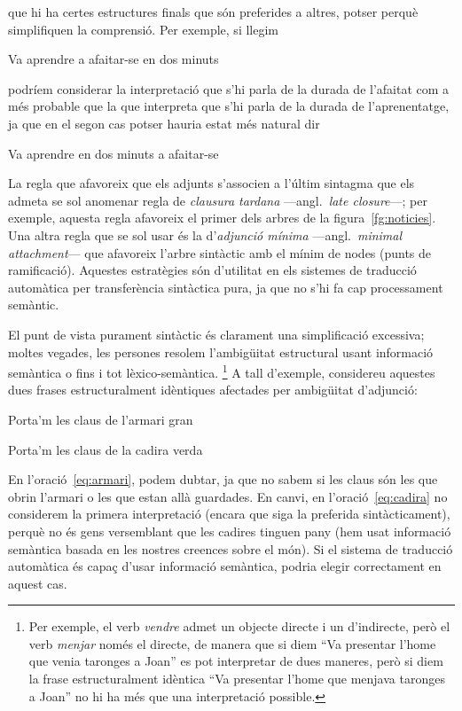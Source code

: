 que hi ha certes estructures finals que són preferides a altres,
potser perquè simplifiquen la comprensió.  Per exemple, si llegim
\begin{exemple}
Va aprendre a afaitar-se en dos minuts
\end{exemple} 
podríem considerar la interpretació que s'hi parla de la durada de
l'afaitat com a més probable que la que interpreta que s'hi parla de
la durada de l'aprenentatge, ja que en el segon cas potser hauria
estat més natural dir 
\begin{exemple}
Va aprendre en dos minuts a afaitar-se
\end{exemple}
La regla que afavoreix que els adjunts s'associen a l'últim sintagma
que els admeta se sol anomenar regla de \emph{clausura tardana}
---angl.\ \emph{late closure}---; per exemple, aquesta regla afavoreix
el primer dels arbres de la figura~\ref{fg:noticies}. Una altra regla que
se sol usar és la d'\emph{adjunció mínima} ---angl.\ \emph{minimal
  attachment}--- que afavoreix l'arbre sintàctic amb el mínim de nodes
(punts de ramificació).  Aquestes estratègies són d'utilitat en els
sistemes de traducció automàtica per transferència sintàctica pura, ja
que no s'hi fa cap processament semàntic.


El punt de vista purament sintàctic és clarament una simplificació
excessiva; moltes vegades, les persones resolem l'ambigüitat
estructural usant informació semàntica o fins i tot lèxico-semàntica.
\footnote{Per exemple, el verb \emph{vendre} admet un objecte directe
  i un d'indirecte, però el verb \emph{menjar} només el directe, de
  manera que si diem ``Va presentar l'home que venia taronges a Joan''
  es pot interpretar de dues maneres, però si diem la frase
  estructuralment idèntica ``Va presentar l'home que menjava taronges
  a Joan'' no hi ha més que una interpretació possible.} A tall
d'exemple, considereu aquestes dues frases estructuralment idèntiques
afectades per ambigüitat d'adjunció:
\begin{exemple}
\label{eq:armari}
Porta'm les claus de l'armari gran
\end{exemple} 
\begin{exemple}
\label{eq:cadira}
Porta'm les claus de la cadira verda
\end{exemple} 
En l'oració~\ref{eq:armari}, podem dubtar, ja que no sabem si les
claus són les que obrin l'armari o les que estan allà guardades. En
canvi, en l'oració~\ref{eq:cadira} no considerem la primera
interpretació (encara que siga la preferida sintàcticament), perquè no
és gens versemblant que les cadires tinguen pany (hem usat informació
semàntica basada en les nostres creences sobre el món). Si el sistema
de traducció automàtica és capaç d'usar informació semàntica, podria
elegir correctament en aquest cas.


